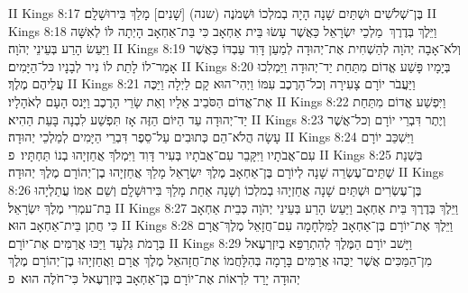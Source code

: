 II Kings 8:17	בֶּן־שְׁלֹשִׁים וּשְׁתַּיִם שָׁנָה הָיָה בְמלְכוֹ וּשְׁמֹנֶה (שנה) [שָׁנִים] מָלַךְ בִּירוּשָׁלָ͏ִם׃
II Kings 8:18	וַיֵּלֶךְ בְּדֶרֶךְ  מַלְכֵי יִשְׂרָאֵל כַּאֲשֶׁר עָשׂוּ בֵּית אַחְאָב כִּי בַּת־אַחְאָב הָיְתָה לּוֹ לְאִשָּׁה וַיַּעַשׂ הָרַע בְּעֵינֵי יְהֹוָה׃
II Kings 8:19	וְלֹא־אָבָה יְהֹוָה לְהַשְׁחִית אֶת־יְהוּדָה לְמַעַן דָּוִד עַבְדּוֹ כַּאֲשֶׁר אָמַר־לוֹ לָתֵת לוֹ נִיר לְבָנָיו כּל־הַיָּמִים׃
II Kings 8:20	בְּיָמָיו פָּשַׁע אֱדוֹם מִתַּחַת יַד־יְהוּדָה וַיַּמְלִכוּ עֲלֵיהֶם מֶלֶךְ׃
II Kings 8:21	וַיַּעֲבֹר יוֹרָם צָעִירָה וְכל־הָרֶכֶב עִמּוֹ וַיְהִי־הוּא קָם לַיְלָה וַיַּכֶּה אֶת־אֱדוֹם הַסֹּבֵיב אֵלָיו וְאֵת שָׂרֵי הָרֶכֶב וַיָּנס הָעָם לְאֹהָלָיו׃
II Kings 8:22	וַיִּפְשַׁע אֱדוֹם מִתַּחַת יַד־יְהוּדָה עַד הַיּוֹם הַזֶּה אָז תִּפְשַׁע לִבְנָה בָּעֵת הַהִיא׃
II Kings 8:23	וְיֶתֶר דִּבְרֵי יוֹרָם וְכל־אֲשֶׁר עָשָׂה הֲלֹא־הֵם כְּתוּבִים עַל־סֵפֶר דִּבְרֵי הַיָּמִים לְמַלְכֵי יְהוּדָה׃
II Kings 8:24	וַיִּשְׁכַּב יוֹרָם עִם־אֲבֹתָיו וַיִּקָּבֵר עִם־אֲבֹתָיו בְּעִיר דָּוִד וַיִּמְלֹךְ אֲחַזְיָהוּ בְנוֹ תַּחְתָּיו׃ {פ}
II Kings 8:25	בִּשְׁנַת שְׁתֵּים־עֶשְׂרֵה שָׁנָה לְיוֹרָם בֶּן־אַחְאָב מֶלֶךְ יִשְׂרָאֵל מָלַךְ אֲחַזְיָהוּ בֶן־יְהוֹרָם מֶלֶךְ יְהוּדָה׃
II Kings 8:26	בֶּן־עֶשְׂרִים וּשְׁתַּיִם שָׁנָה אֲחַזְיָהוּ בְמלְכוֹ וְשָׁנָה אַחַת מָלַךְ בִּירוּשָׁלָ͏ִם וְשֵׁם אִמּוֹ עֲתַלְיָהוּ בַּת־עמְרִי מֶלֶךְ יִשְׂרָאֵל׃
II Kings 8:27	וַיֵּלֶךְ בְּדֶרֶךְ בֵּית אַחְאָב וַיַּעַשׂ הָרַע בְּעֵינֵי יְהֹוָה כְּבֵית אַחְאָב כִּי חֲתַן בֵּית־אַחְאָב הוּא׃
II Kings 8:28	וַיֵּלֶךְ אֶת־יוֹרָם בֶּן־אַחְאָב לַמִּלְחָמָה עִם־חֲזָאֵל מֶלֶךְ־אֲרָם בְּרָמֹת גִּלְעָד וַיַּכּוּ אֲרַמִּים אֶת־יוֹרָם׃
II Kings 8:29	וַיָּשׁב יוֹרָם הַמֶּלֶךְ לְהִתְרַפֵּא בְיִזְרְעֶאל מִן־הַמַּכִּים אֲשֶׁר יַכֻּהוּ אֲרַמִּים בָּרָמָה בְּהִלָּחֲמוֹ אֶת־חֲזָהאֵל מֶלֶךְ אֲרָם וַאֲחַזְיָהוּ בֶן־יְהוֹרָם מֶלֶךְ יְהוּדָה יָרַד לִרְאוֹת אֶת־יוֹרָם בֶּן־אַחְאָב בְּיִזְרְעֶאל כִּי־חֹלֶה הוּא׃ {פ}
